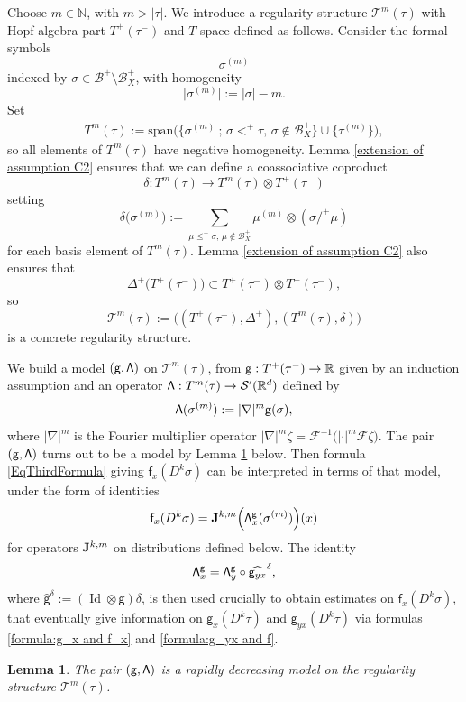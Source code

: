 \documentclass[10pt]{amsart}
\theoremstyle{plain}
\newtheorem{lem}[thm]{Lemma}
\theoremstyle{definition}
\DeclareMathOperator{\iden}{Id}
\newcommand{\sff}{\mathsf{f}}
\newcommand{\sfg}{\mathsf{g}}
\newcommand{\scrT}{\mathscr{T}}
\newcommand{\bbN}{\mathbb{N}}
\newcommand{\bbR}{\mathbb{R}}
\newcommand{\mcB}{\mathcal{B}}
\newcommand{\mcF}{\mathcal{F}}
\begin{document}
Choose $m\in\bbN$, with $m>\vert\tau\vert$. We introduce a regularity structure $\scrT^m(\tau)$ with Hopf algebra part $T^+(\tau^-)$ and $T$-space defined as follows.
Consider the formal symbols
\[
\sigma^{(m)}
\]
indexed by $\sigma\in\mcB^+\setminus\mcB_X^+$, with homogeneity
\[
\big|\sigma^{(m)}\big| := |\sigma| - m.
\]
Set
\begin{align*}
T^m(\tau) := \textrm{span}
\bigl(\big\{\sigma^{(m)}\ ;\,\sigma<^+\tau,\, \sigma\notin\mcB_X^+\big\}
\cup\big\{\tau^{(m)}\big\}\bigr),
\end{align*}
so all elements of $T^m(\tau)$ have negative homogeneity.
Lemma \ref{extension of assumption C2} ensures that we can define a coassociative coproduct
\[
\delta: T^m(\tau)\to T^m(\tau)\otimes T^+(\tau^-)
\]
setting
\[
\delta\bigl(\sigma^{(m)}\bigr) := \sum_{\mu\leq^+\sigma,\,\mu\notin\mcB_X^+} \mu^{(m)}\otimes(\sigma/^+\mu)
\]
for each basis element of $T^m(\tau)$.
Lemma \ref{extension of assumption C2} also ensures that
\[
\Delta^+\bigl(T^+(\tau^-)\bigr) \subset T^+(\tau^-)\otimes T^+(\tau^-),
\]
so
\[
\scrT^m(\tau) := \bigl((T^+(\tau^-),\Delta^+), (T^m(\tau),\delta)\bigr)
\]
is a concrete regularity structure.

We build a model $\sf (g,\Lambda)$ on $\scrT^m(\tau)$, from ${\sf g} : T^+(\tau^-)\to\bbR$ given by an induction assumption and an operator ${\sf\Lambda}:T^m(\tau)\to\mathcal{S}'(\mathbb{R}^d)$ defined by
\[
{\sf\Lambda}(\sigma^{(m)}) := |\nabla|^m {\sf g}(\sigma),
\]
where $|\nabla|^m$ is the Fourier multiplier operator $|\nabla|^m\zeta = \mcF^{-1}\bigl(|{\cdot}|^m\mcF\zeta\bigr)$.
The pair $\sf(g,\Lambda)$ turns out to be a model by Lemma \ref{lem:model on T^M} below. Then formula \eqref{EqThirdFormula} giving $\sff_x(D^k\sigma)$ can be interpreted in terms of that model, under the form of identities
\[
\sff_x(D^k\sigma) = {\bf J}^{k,m}\Bigl({\sf \Lambda}^\sfg_x(\sigma^{(m)})\Bigr)(x)
\]
for operators ${\bf J}^{k,m}$ on distributions defined below. The identity
\[
{\sf \Lambda}^\sfg_x = {\sf \Lambda}^\sfg_y \circ\widehat{\sfg_{yx}}^\delta,
\]
where $\widehat{\sfg}^\delta := (\iden\otimes \sfg)\delta$, is then used crucially to obtain estimates on $\sff_x(D^k\sigma)$, that eventually give information on $\sfg_x(D^k\tau)$ and $\sfg_{yx}(D^k\tau)$ via formulas \eqref{formula:g_x and f_x} and \eqref{formula:g_yx and f}.

\begin{lem}\label{lem:model on T^M}
The pair $({\sf g},{\sf\Lambda})$ is a rapidly decreasing model on the regularity structure $\scrT^m(\tau)$.
\end{lem}
\end{document}

